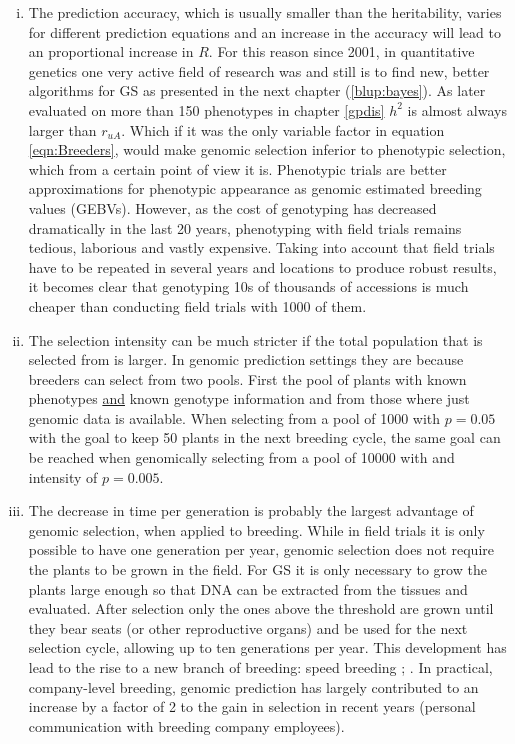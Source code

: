 \begin{enumerate}[(i)]
\item The prediction accuracy, which is usually smaller than the heritability, varies for
  different prediction equations and an increase in the accuracy will lead to an
  proportional increase in $R$. For this reason since 2001, in quantitative genetics one
  very active field of research was and still is to find new, better algorithms for GS as
  presented in the next chapter (\ref{blup:bayes}). As later evaluated on more than 150
  phenotypes in chapter \ref{gpdis} $h^2$ is almost always larger than $r_{uA}$. Which if
  it was the only variable factor in equation \ref{eqn:Breeders}, would make genomic
  selection inferior to phenotypic selection, which from a certain point of view it
  is. Phenotypic trials are better approximations for phenotypic appearance as genomic
  estimated breeding values (GEBVs). However, as the cost of genotyping has decreased
  dramatically in the last 20 years, phenotyping with field trials remains tedious,
  laborious and vastly expensive. Taking into account that field trials have to be
  repeated in several years and locations to produce robust results, it becomes clear
  that genotyping 10s of thousands of accessions is much cheaper than conducting field
  trials with 1000 of them.
\item The selection intensity can be much stricter if the total population that is
  selected from is larger. In genomic prediction settings they are because breeders can
  select from two pools. First the pool of plants with known phenotypes \underline{and}
  known genotype information and from those where just genomic data is available. When
  selecting from a pool of 1000 with $p=0.05$ with the goal to keep 50 plants in the next
  breeding cycle, the same goal can be reached when genomically selecting from a pool of
  10000 with and intensity of $p=0.005$.
\item The decrease in time per generation is probably the largest advantage of genomic
  selection, when applied to breeding. While in field trials it is only possible to have
  one generation per year, genomic selection does not require the plants to be grown in
  the field. For GS it is only necessary to grow the plants large enough so that DNA can be
  extracted from the tissues and evaluated. After selection only the ones above the
  threshold are grown until they bear seats (or other reproductive organs) and be used for
  the next selection cycle, allowing up to ten generations per year. This development has
  lead to the rise to a new branch of breeding: speed breeding \cite{ghosh2018speed};
  \cite{watson2018speed}. In practical, company-level breeding, genomic prediction has
  largely contributed to an increase by a factor of 2 to the gain in selection in recent
  years (personal communication with breeding company employees).
\end{enumerate}

